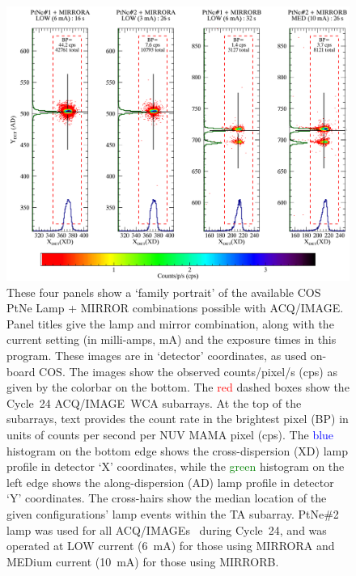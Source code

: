 \documentclass[12pt]{reportj}
\newcommand*{\myfont}{\fontfamily{rm}\selectfont}
\def\acqimage{{\myfont ACQ/IMAGE}\rm}
\def\acqimages{{\myfont ACQ/IMAGE{\rm s}}\rm}
\begin{document}
\begin{description}
\begin{figure}[!h]
	\centering
	\includegraphics[width=\textwidth]{C24_14857_FP.png}
	\caption{These four panels show a `family portrait' of the available COS PtNe Lamp + MIRROR combinations possible with \acqimage. Panel titles give the lamp and mirror combination, along with the current setting (in milli-amps, mA) and the exposure times in this program.
	These images are in `detector' coordinates, as used on-board COS.
	The images show the observed counts/pixel/s (cps) as given by the colorbar on the bottom.
	The \textcolor{red}{red} dashed boxes show the Cycle~24 \acqimage~WCA subarrays. At the top of the subarrays, text provides the count rate in the brightest pixel (BP) in units of counts per second per NUV MAMA pixel (cps).
	The \textcolor{blue}{blue} histogram on the bottom edge shows the cross-dispersion (XD) lamp profile in detector `X' coordinates, while
	the \textcolor{green}{green} histogram on the left edge shows the along-dispersion (AD) lamp profile in detector `Y' coordinates.
	The cross-hairs show the median location of the given configurations' lamp events within the TA subarray.
	PtNe\#2 lamp was used for all \acqimages~ during Cycle~24, and was operated at LOW current (6~mA) for those using MIRRORA and MEDium current (10~mA) for those using MIRRORB.
	}
	\label{fig:FP}
	\vspace{1.3cm}
	\end{figure}

\end{description}
\end{document}
